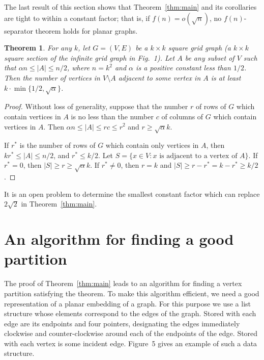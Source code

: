 \documentclass[12pt]{article}
\newtheorem{theorem}{Theorem}
\theoremstyle{remark}
\begin{document}
The last result of this section shows that Theorem~\ref{thm:main} and its
corollaries are tight to within a constant factor; that is, if $f(n) = o(\sqrt{n})$,
no $f(n)$-separator theorem holds for planar graphs.

\begin{theorem}
\label{thm:tight}
For any $k$, let $G = (V, E)$ be a $k \times k$ square grid graph (a $k \times k$
square section of the infinite grid graph in Fig.~1). Let $A$ be any subset of $V$
such that $\alpha n \leq |A| \leq n/2$, where $n = k^2$ and $\alpha$ is a positive
constant less than $1/2$. Then the number of vertices in $V \setminus A$ adjacent to
some vertex in $A$ is at least $k \cdot \min\{1/2, \sqrt{\alpha}\}$.
\end{theorem}

\begin{proof}
Without loss of generality, suppose that the number $r$ of rows of $G$ which contain
vertices in $A$ is no less than the number $c$ of columns of $G$ which contain
vertices in $A$. Then $\alpha n \leq |A| \leq rc \leq r^2$ and $r \geq \sqrt{\alpha}k$.

If $r^*$ is the number of rows of $G$ which contain only vertices in $A$, then
$kr^* \leq |A| \leq n/2$, and $r^* \leq k/2$. Let $S = \{x \in V : x \text{ is
adjacent to a vertex of } A\}$. If $r^* = 0$, then $|S| \geq r \geq \sqrt{\alpha}k$.
If $r^* \neq 0$, then $r = k$ and $|S| \geq r - r^* = k - r^* \geq k/2$.
\end{proof}

It is an open problem to determine the smallest constant factor which can replace
$2\sqrt{2}$ in Theorem~\ref{thm:main}.

\section{An algorithm for finding a good partition}

The proof of Theorem~\ref{thm:main} leads to an algorithm for finding a vertex
partition satisfying the theorem. To make this algorithm efficient, we need a good
representation of a planar embedding of a graph. For this purpose we use a list
structure whose elements correspond to the edges of the graph. Stored with each edge
are its endpoints and four pointers, designating the edges immediately clockwise and
counter-clockwise around each of the endpoints of the edge. Stored with each vertex
is some incident edge. Figure~5 gives an example of such a data structure.
\end{document}
